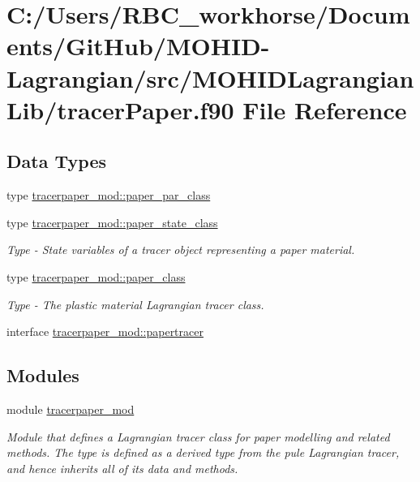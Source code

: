 \hypertarget{tracer_paper_8f90}{}\section{C\+:/\+Users/\+R\+B\+C\+\_\+workhorse/\+Documents/\+Git\+Hub/\+M\+O\+H\+I\+D-\/\+Lagrangian/src/\+M\+O\+H\+I\+D\+Lagrangian\+Lib/tracer\+Paper.f90 File Reference}
\label{tracer_paper_8f90}
\subsection*{Data Types}
\begin{DoxyCompactItemize}
\item 
type \mbox{\hyperlink{structtracerpaper__mod_1_1paper__par__class}{tracerpaper\+\_\+mod\+::paper\+\_\+par\+\_\+class}}
\item 
type \mbox{\hyperlink{structtracerpaper__mod_1_1paper__state__class}{tracerpaper\+\_\+mod\+::paper\+\_\+state\+\_\+class}}
\begin{DoxyCompactList}\small\item\em Type -\/ State variables of a tracer object representing a paper material. \end{DoxyCompactList}\item 
type \mbox{\hyperlink{structtracerpaper__mod_1_1paper__class}{tracerpaper\+\_\+mod\+::paper\+\_\+class}}
\begin{DoxyCompactList}\small\item\em Type -\/ The plastic material Lagrangian tracer class. \end{DoxyCompactList}\item 
interface \mbox{\hyperlink{interfacetracerpaper__mod_1_1papertracer}{tracerpaper\+\_\+mod\+::papertracer}}
\end{DoxyCompactItemize}
\subsection*{Modules}
\begin{DoxyCompactItemize}
\item 
module \mbox{\hyperlink{namespacetracerpaper__mod}{tracerpaper\+\_\+mod}}
\begin{DoxyCompactList}\small\item\em Module that defines a Lagrangian tracer class for paper modelling and related methods. The type is defined as a derived type from the pule Lagrangian tracer, and hence inherits all of it\textquotesingle{}s data and methods. \end{DoxyCompactList}\end{DoxyCompactItemize}
